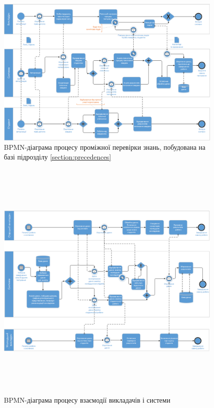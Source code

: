 




\begin{figure}[htbp]
    \center\includegraphics[width=\textwidth]{images/bpmn_tests.png}
    \caption{BPMN-діаграма процесу проміжної перевірки знань,
    побудована на базі підрозділу \ref{section:precedences}}
\end{figure}

\begin{figure}[htbp]
    \center\includegraphics[height=33em,angle=90]{images/bpmn_teachers.png}
    \caption{BPMN-діаграма процесу взаємодії викладачів і системи}
\end{figure}
